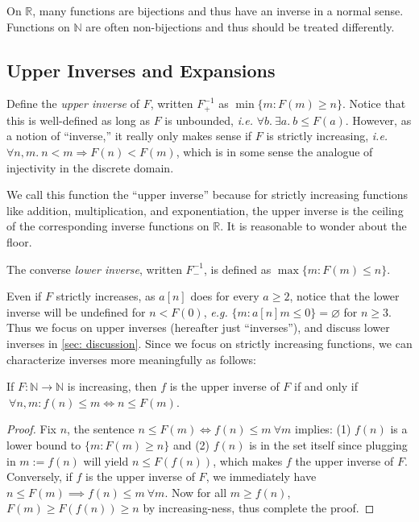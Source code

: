 On $\mathbb{R}$, many functions are bijections and thus have an inverse in a normal sense.  Functions on $\mathbb{N}$ are often non-bijections and thus should be treated differently.

\subsection{Upper Inverses and Expansions}
\begin{defn} \label{defn: inverse}
Define the \emph{upper inverse} of $F$, written $F^{-1}_{+}$ as $\min\{m : F(m)\ge n\}$.
Notice that this is well-defined as long as $F$ is unbounded, \emph{i.e.} $\forall b.~\exists a.~ b \leq F(a)$.  However, as a notion of ``inverse,'' it really only makes sense if $F$ is strictly
increasing, \emph{i.e.} $\forall n,m.~ n < m \Rightarrow F(n) < F(m)$, which is in some sense the analogue of injectivity in the discrete domain.
\end{defn}
We call this function the ``upper inverse'' because for strictly increasing functions like
addition, multiplication, and exponentiation, the upper inverse is the ceiling of the 
corresponding inverse functions on $\mathbb{R}$.  It is reasonable to wonder about the floor.
\begin{defn} \label{defn: lower_inverse}
The converse \emph{lower inverse}, written $F^{-1}_{-}$,
is defined as $\max\{m : F(m)\le n\}$.
\end{defn}
Even if $F$ strictly increases, as $a[n]$ does for every $a\ge 2$, notice that the lower inverse will be undefined for $n < F(0)$, \emph{e.g.} $\{m : a[n]m \le 0 \} = \varnothing$ for $n\ge 3$.
Thus we focus on upper inverses (hereafter just ``inverses''), and discuss lower inverses in \cref{sec: discussion}. Since we focus on strictly increasing functions, we can characterize inverses more meaningfully as follows:
\begin{thm} \label{thm: upp-inverse-rel}
	If $F:\mathbb{N}\to \mathbb{N}$ is increasing, then $f$ is the upper inverse of $F$ if and only if $\ \forall n, m : f(n)\le m \iff n \le F(m)$.
\end{thm}
\begin{proof}
Fix $n$, the sentence $n\le F(m) \iff f(n)\le m \ \forall m$ implies: (1) $f(n)$ is a lower bound to $\{m: F(m)\ge n \}$ and (2) $f(n)$ is in the set itself since plugging in $m := f(n)$ will yield $n\le F(f(n))$, which makes $f$ the upper inverse of $F$. Conversely, if $f$ is the upper inverse of $F$, we immediately have $n\le F(m)\implies f(n)\le m \ \forall m$. Now for all $m \ge f(n)$, $F(m)\ge F(f(n)) \ge n$ by increasing-ness, thus complete the proof.
\end{proof}

